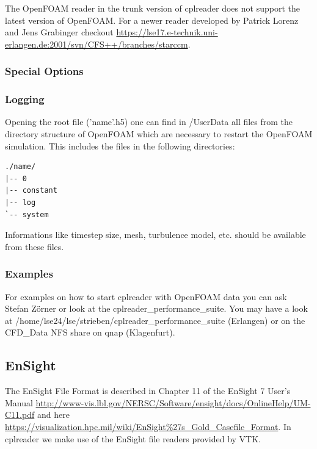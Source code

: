 \documentclass[a4paper,10pt]{article}
\begin{document}
The OpenFOAM  reader in the  trunk version of  cplreader does not  support the
latest version of OpenFOAM. For a newer reader developed by Patrick Lorenz and
Jens                             Grabinger                            checkout
\url{https://lse17.e-technik.uni-erlangen.de:2001/svn/CFS++/branches/starccm}.

\subsubsection{Special Options}

\subsubsection{Logging} 

Opening the  root \hdf file  ('name'.h5) one can  find in /UserData  all files
from the  directory structure of OpenFOAM  which are necessary  to restart the
OpenFOAM simulation. This includes the files in the following directories:

\begin{verbatim}
./name/
|-- 0
|-- constant
|-- log
`-- system
\end{verbatim}

Informations  like  timestep size,  mesh,  turbulence  model,  etc. should  be
available from these files.

\subsubsection{Examples}

For examples on  how to start cplreader with OpenFOAM data  you can ask Stefan
Zörner or look  at the cplreader\_performance\_suite.  You may  have a look at
/home/lse24/lse/strieben/cplreader\_performance\_suite  (Erlangen)  or on  the
CFD\_Data NFS share on qnap (Klagenfurt).

\newpage
\subsection{EnSight}
\label{sec:ensight}

The EnSight  File Format is  described in Chapter  11 of the EnSight  7 User's
Manual
\url{http://www-vis.lbl.gov/NERSC/Software/ensight/docs/OnlineHelp/UM-C11.pdf}
and                                                                        here
\url{https://visualization.hpc.mil/wiki/EnSight%27s_Gold_Casefile_Format}.   In
cplreader we make use of the EnSight file readers provided by VTK.
\end{document}
